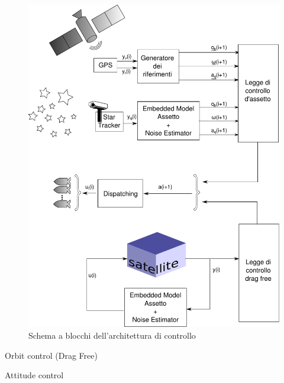 \begin{figure}[ht!]
	\includegraphics[width=\textwidth]{control/images/control.pdf}
	\caption{Schema a blocchi dell'architettura di controllo}
\end{figure}
\begin{section}{Orbit control (Drag Free)}

\end{section}
\begin{section}{Attitude control}

\end{section}